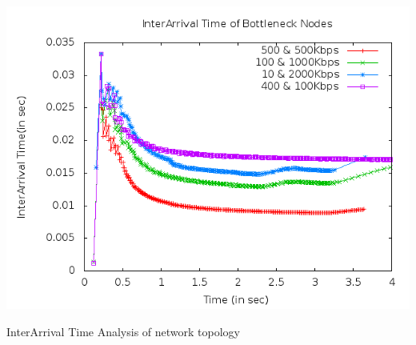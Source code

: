 \documentclass[a4paper,12pt]{report}
\begin{document}
\begin{center}
 \includegraphics[width=15 cm,height=18 cm]{./interarrival.png}

InterArrival Time Analysis of network topology
\end{center}
\end{document}
